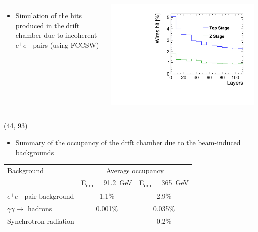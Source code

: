 \documentclass[final,xcolor={dvipsnames,svgnames,x11names,table}]{beamer}
\begin{document}
\begin{frame}
\begin{textblock}{43}
\begin{tcolorbox}[title=Beam-induced backgrounds and the impact on the drift chamber]
\begin{columns}

    \begin{itemize}
      \item Simulation of the hits produced in the drift chamber due to incoherent $e^+e^-$ pairs (using FCCSW)
    \end{itemize}
    \centering
    \includegraphics[width=\textwidth]{Figures/incoherent_top_Z.pdf}




  \end{columns}

  \end{tcolorbox}
\end{textblock}

 \begin{textblock}{39.5}(44, 93)
   \begin{tcolorbox}[title=Conclusions]

   \begin{itemize}
     \item Summary of the occupancy of the drift chamber due to the beam-induced backgrounds \vspace{0.3cm}
   \end{itemize}
   \centering
   \begin{adjustbox}{max width=\textwidth}
     \begin{tabular}{l c c}
       \toprule
        Background & \multicolumn{2}{c}{Average occupancy} \\
         & E\textsubscript{cm} = 91.2~GeV &  E\textsubscript{cm} = 365~GeV \\
        \midrule
        $e^+e^-$ pair background & 1.1\% & 2.9\% \\
        $\gamma\gamma\rightarrow$ hadrons & 0.001\% & 0.035\%  \\
        Synchrotron radiation & - & 0.2\% \\
        \bottomrule
     \end{tabular}
   \end{adjustbox}


\end{tcolorbox}
\end{textblock}
\end{frame}
\end{document}
